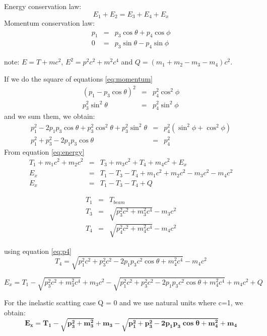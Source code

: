 \documentclass[]{report}
\begin{document}
Energy conservation law:
\begin{equation}
E_1 + E_2 = E_3 + E_4 + E_x
\label{eq:energy}
\end{equation}
Momentum conservation law:
\begin{eqnarray}
p_1 &=& p_3\cos\theta + p_4\cos\phi\nonumber\\
0 &=& p_3\sin\theta - p_4\sin\phi
\label{eq:momentum}
\end{eqnarray}

note: $E =T + mc^2$, $E^2 = p^2c^2 + m^2c^4$ and $Q = (m_1 + m_2 - m_3 - m_4)c^2$.

If we do the square of equations \ref{eq:momentum} 
\begin{eqnarray}
(p_1- p_3\cos\theta)^2 &=&  p_4^2\cos^2\phi\nonumber\\
p_3^2\sin^2\theta &=& p_4^2\sin^2\phi\nonumber
\end{eqnarray}
and we sum them, we obtain:
\begin{eqnarray}
p_1^2 - 2p_1p_3\cos\theta + p_3^2\cos^2\theta + p_3^2\sin^2\theta &=&  p_4^2(\sin^2\phi +\cos^2\phi)\nonumber\\
p_1^2 + p_3^2 - 2p_1p_3\cos\theta &=& p_4^2
\label{eq:p4}
\end{eqnarray}
From equation \ref{eq:energy}
\begin{eqnarray}
T_1 + m_1c^2 + m_2c^2 &=& T_3 + m_3c^2 + T_4 + m_4c^2 + E_x\\
E_x &=& T_1 - T_3 - T_4 + m_1c^2 + m_2c^2 - m_3c^2 - m_4c^2 \nonumber\\
E_x &=& T_1 - T_3 - T_4 + Q
\end{eqnarray}

\begin{eqnarray}
T_1 &=& T_{beam}\nonumber\\
T_3 &=& \sqrt{p^2_3c^2+m_3^2c^4} - m_3c^2\nonumber\\
T_4 &=& \sqrt{p^2_4c^2+m_4^2c^4} - m_4c^2
\end{eqnarray}

using equation \ref{eq:p4}
\begin{equation}
T_4 = \sqrt{p_1^2c^2 + p_3^2c^2 - 2p_1p_3c^2\cos\theta+m_4^2c^4} - m_4c^2
\end{equation}

\begin{equation}
E_x = T_1 -\sqrt{p^2_3c^2+m_3^2c^4} + m_3c^2 - \sqrt{p_1^2c^2 + p_3^2c^2 - 2p_1p_3c^2\cos\theta+m_4^2c^4} + m_4c^2 + Q
\end{equation}

For the inelastic scatting case Q = 0 and we use natural units where c=1, we obtain:
\begin{equation}
\mathbf{E_x = T_1 -\sqrt{p^2_3+m_3^2} + m_3 - \sqrt{p_1^2 + p_3^2 - 2p_1p_3\cos\theta+m_4^2} + m_4}
\end{equation}
\\
\end{document}
